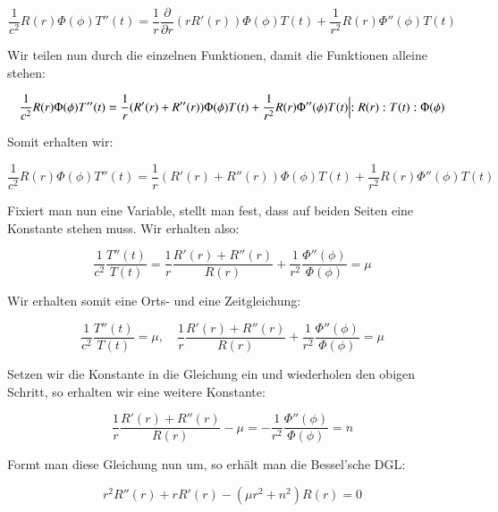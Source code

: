 \begin{equation}
\frac{1}{c^2} R(r) \Phi(\phi) T''(t) = \frac{1}{r} \frac{\partial}{\partial r}(r R'(r)) \Phi(\phi) T(t) + \frac{1}{r^2} R(r) \Phi''(\phi) T(t)
\end{equation}

Wir teilen nun durch die einzelnen Funktionen, damit die Funktionen alleine stehen:

\begin{equation}
\frac{1}{c^2} R(r) \Phi(\phi) T''(t) = \frac{1}{r}(R'(r) + R''(r)) \Phi(\phi) T(t) + \frac{1}{r^2} R(r) \Phi''(\phi) T(t)
\Bigl\lvert
:R(r) : T(t) :\Phi(\phi)
\end{equation}

Somit erhalten wir:

\begin{equation}
\frac{1}{c^2} R(r) \Phi(\phi) T''(t) = \frac{1}{r} (R'(r) + R''(r)) \Phi(\phi) T(t) + \frac{1}{r^2} R(r) \Phi''(\phi) T(t)
\end{equation}

Fixiert man nun eine Variable, stellt man fest, dass auf beiden Seiten eine Konstante stehen muss. Wir erhalten also:

\begin{equation}
\frac{1}{c^2}
\frac{T''(t)}{T(t)} = 
\frac{1}{r} 
\frac{R'(r) + R''(r)}{R(r)} + 
\frac{1}{r^2}
\frac{\Phi''(\phi)}{\Phi(\phi)} = \mu
\end{equation}

Wir erhalten somit eine Orts- und eine Zeitgleichung:

\begin{equation}
\frac{1}{c^2} 
\frac{T''(t)}{T(t)} = 
\mu
,\quad
\frac{1}{r} \frac{R'(r) + R''(r)}{R(r)} + 
\frac{1}{r^2} \frac{\Phi''(\phi)}{\Phi(\phi)} = 
\mu
\end{equation}

Setzen wir die Konstante in die Gleichung ein und wiederholen den obigen Schritt, so erhalten wir eine weitere Konstante:

\begin{equation}
\frac{1}{r} \frac{R'(r) + R''(r)}{R(r)} - \mu =
-\frac{1}{r^2} \frac{\Phi''(\phi)}{\Phi(\phi)} = n
\end{equation}

Formt man diese Gleichung nun um, so erhält man die Bessel'sche DGL:

\begin{equation}
r^2 R''(r) + r R'(r) - (\mu r^2 + n^2)R(r) = 0
\label{eq:besselsche_dgl}
\end{equation}
